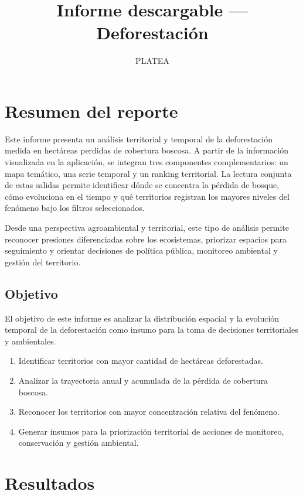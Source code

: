 \documentclass[
]{article}
\title{Informe descargable --- Deforestación}
\subtitle{PLATEA}
\author{}
\date{\vspace{-2.5em}}
\providecommand{\tightlist}{%
  \setlength{\itemsep}{0pt}\setlength{\parskip}{0pt}}
\begin{document}
\maketitle

{
\setcounter{tocdepth}{2}
\tableofcontents
}
\section{Resumen del reporte}\label{resumen-del-reporte}

Este informe presenta un análisis territorial y temporal de la
deforestación medida en hectáreas perdidas de cobertura boscosa. A
partir de la información visualizada en la aplicación, se integran tres
componentes complementarios: un mapa temático, una serie temporal y un
ranking territorial. La lectura conjunta de estas salidas permite
identificar dónde se concentra la pérdida de bosque, cómo evoluciona en
el tiempo y qué territorios registran los mayores niveles del fenómeno
bajo los filtros seleccionados.

Desde una perspectiva agroambiental y territorial, este tipo de análisis
permite reconocer presiones diferenciadas sobre los ecosistemas,
priorizar espacios para seguimiento y orientar decisiones de política
pública, monitoreo ambiental y gestión del territorio.

\subsection{Objetivo}\label{objetivo}

El objetivo de este informe es analizar la distribución espacial y la
evolución temporal de la deforestación como insumo para la toma de
decisiones territoriales y ambientales.

\begin{enumerate}
\def\labelenumi{\arabic{enumi}.}
\tightlist
\item
  Identificar territorios con mayor cantidad de hectáreas deforestadas.
\item
  Analizar la trayectoria anual y acumulada de la pérdida de cobertura
  boscosa.
\item
  Reconocer los territorios con mayor concentración relativa del
  fenómeno.
\item
  Generar insumos para la priorización territorial de acciones de
  monitoreo, conservación y gestión ambiental.
\end{enumerate}

\section{Resultados}\label{resultados}
\end{document}
